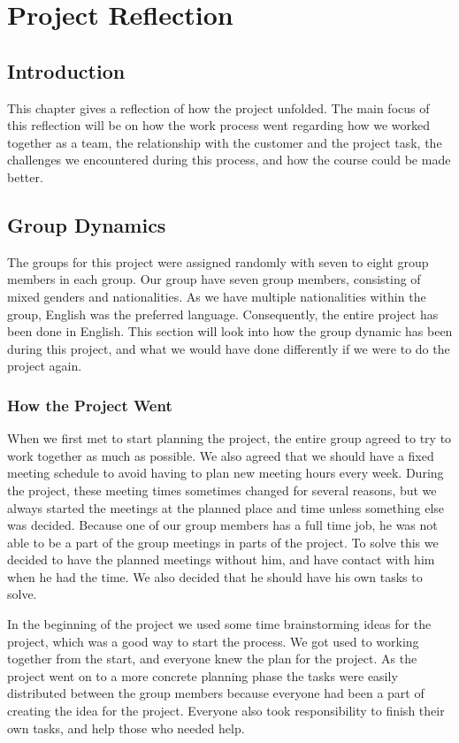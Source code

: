 \documentclass[../document]{subfiles}
\begin{document}
\section{Project Reflection}
\subsection{Introduction}
This chapter gives a reflection of how the project unfolded. The main focus of this reflection will be on how the work process went regarding how we worked together as a team, the relationship with the customer and the project task, the challenges we encountered during this process, and how the course could be made better. 

\subsection{Group Dynamics}
The groups for this project were assigned randomly with seven to eight group members in each group. Our group have seven group members, consisting of mixed genders and nationalities. As we have multiple nationalities within the group, English was the preferred language. Consequently, the entire project has been done in English. This section will look into how the group dynamic has been during this project, and what we would have done differently if we were to do the project again. 

\subsubsection{How the Project Went}
When we first met to start planning the project, the entire group agreed to try to work together as much as possible. We also agreed that we should have a fixed meeting schedule to avoid having to plan new meeting hours every week. During the project, these meeting times sometimes changed for several reasons, but we always started the meetings at the planned place and time unless something else was decided. Because one of our group members has a full time job, he was not able to be a part of the group meetings in parts of the project. To solve this we decided to have the planned meetings without him, and have contact with him when he had the time. We also decided that he should have his own tasks to solve. 

In the beginning of the project we used some time brainstorming ideas for the project, which was a good way to start the process. We got used to working together from the start, and everyone knew the plan for the project. As the project went on to a more concrete planning phase the tasks were easily distributed between the group members because everyone had been a part of creating the idea for the project. Everyone also took responsibility to finish their own tasks, and help those who needed help. 
\end{document}
